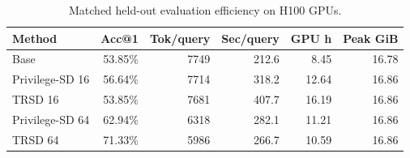 \begin{table}[t]
\centering
\small
\caption{Matched held-out evaluation efficiency on H100 GPUs.}
\label{tab:trsd-eval-efficiency}
\begin{tabular}{lrrrrr}
\toprule
Method & Acc@1 & Tok/query & Sec/query & GPU h & Peak GiB \\
\midrule
Base & 53.85\% & 7749 & 212.6 & 8.45 & 16.78 \\
Privilege-SD 16 & 56.64\% & 7714 & 318.2 & 12.64 & 16.86 \\
TRSD 16 & 53.85\% & 7681 & 407.7 & 16.19 & 16.86 \\
Privilege-SD 64 & 62.94\% & 6318 & 282.1 & 11.21 & 16.86 \\
TRSD 64 & 71.33\% & 5986 & 266.7 & 10.59 & 16.86 \\
\bottomrule
\end{tabular}
\end{table}

